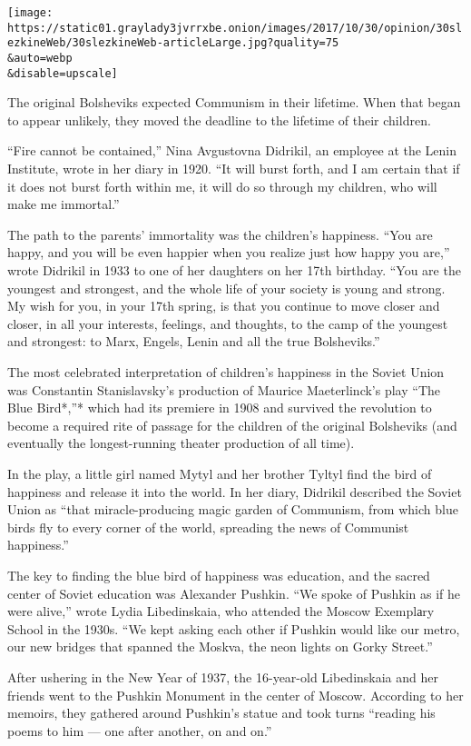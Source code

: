 \texttt{[image: https://static01.graylady3jvrrxbe.onion/images/2017/10/30/opinion/30slezkineWeb/30slezkineWeb-articleLarge.jpg?quality=75\\\&auto=webp\\\&disable=upscale]}

The original Bolsheviks expected Communism in their lifetime. When that
began to appear unlikely, they moved the deadline to the lifetime of
their children.

``Fire cannot be contained,'' Nina Avgustovna Didrikil, an employee at
the Lenin Institute, wrote in her diary in 1920. ``It will burst forth,
and I am certain that if it does not burst forth within me, it will do
so through my children, who will make me immortal.''

The path to the parents' immortality was the children's happiness. ``You
are happy, and you will be even happier when you realize just how happy
you are,'' wrote Didrikil in 1933 to one of her daughters on her 17th
birthday. ``You are the youngest and strongest, and the whole life of
your society is young and strong. My wish for you, in your 17th spring,
is that you continue to move closer and closer, in all your interests,
feelings, and thoughts, to the camp of the youngest and strongest: to
Marx, Engels, Lenin and all the true Bolsheviks.''

The most celebrated interpretation of children's happiness in the Soviet
Union was Constantin Stanislavsky's production of Maurice Maeterlinck's
play ``The Blue Bird*,''* which had its premiere in 1908 and survived
the revolution to become a required rite of passage for the children of
the original Bolsheviks (and eventually the longest-running theater
production of all time).

In the play, a little girl named Mytyl and her brother Tyltyl find the
bird of happiness and release it into the world. In her diary, Didrikil
described the Soviet Union as ``that miracle-producing magic garden of
Communism, from which blue birds fly to every corner of the world,
spreading the news of Communist happiness.''

The key to finding the blue bird of happiness was education, and the
sacred center of Soviet education was Alexander Pushkin. ``We spoke of
Pushkin as if he were alive,'' wrote Lydia Libedinskaia, who attended
the Moscow Exemplаry School in the 1930s. ``We kept asking each other if
Pushkin would like our metro, our new bridges that spanned the Moskva,
the neon lights on Gorky Street.''

After ushering in the New Year of 1937, the 16-year-old Libedinskaia and
her friends went to the Pushkin Monument in the center of Moscow.
According to her memoirs, they gathered around Pushkin's statue and took
turns ``reading his poems to him --- one after another, on and on.''

